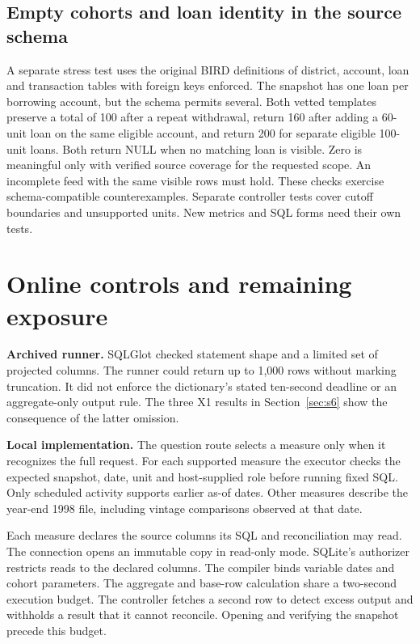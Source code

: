 \documentclass[11pt,a4paper,onecolumn,oneside]{rho-class/rho}
\begin{document}
\subsection{Empty cohorts and loan identity in the source schema}
A separate stress test uses the original BIRD definitions of district, account, loan and transaction tables with foreign keys enforced. The snapshot has one loan per borrowing account, but the schema permits several. Both vetted templates preserve a total of 100 after a repeat withdrawal, return 160 after adding a 60-unit loan on the same eligible account, and return 200 for separate eligible 100-unit loans. Both return NULL when no matching loan is visible. Zero is meaningful only with verified source coverage for the requested scope. An incomplete feed with the same visible rows must hold. These checks exercise schema-compatible counterexamples. Separate controller tests cover cutoff boundaries and unsupported units. New metrics and SQL forms need their own tests.

\clearpage

\section{Online controls and remaining exposure}

\label{sec:s10}

\textbf{Archived runner.} SQLGlot checked statement shape and a limited set of projected columns. The runner could return up to 1,000 rows without marking truncation. It did not enforce the dictionary's stated ten-second deadline or an aggregate-only output rule. The three X1 results in Section~\ref{sec:s6} show the consequence of the latter omission.

\textbf{Local implementation.} The question route selects a measure only when it recognizes the full request. For each supported measure the executor checks the expected snapshot, date, unit and host-supplied role before running fixed SQL. Only scheduled activity supports earlier as-of dates. Other measures describe the year-end 1998 file, including vintage comparisons observed at that date.

Each measure declares the source columns its SQL and reconciliation may read. The connection opens an immutable copy in read-only mode. SQLite's authorizer restricts reads to the declared columns. The compiler binds variable dates and cohort parameters. The aggregate and base-row calculation share a two-second execution budget. The controller fetches a second row to detect excess output and withholds a result that it cannot reconcile. Opening and verifying the snapshot precede this budget.
\end{document}
